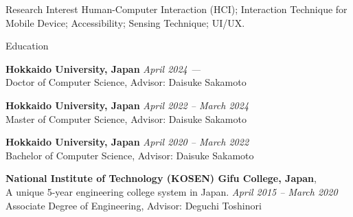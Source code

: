 \documentclass[
	11pt, %
]{resume} %
\begin{document}
\begin{rSection}{Research Interest}
Human-Computer Interaction (HCI); Interaction Technique for Mobile Device; Accessibility; Sensing Technique; UI/UX.
\end{rSection}

\begin{rSection}{Education}
	
	\textbf{Hokkaido University, Japan} \hfill \textit{April 2024 ---} \\ 
	Doctor of Computer Science, Advisor: Daisuke Sakamoto 
    
    \textbf{Hokkaido University, Japan} \hfill \textit{April 2022 -- March 2024} \\ 
	Master of Computer Science, Advisor: Daisuke Sakamoto 

    \textbf{Hokkaido University, Japan} \hfill \textit{April 2020 -- March 2022} \\ 
	Bachelor of Computer Science, Advisor: Daisuke Sakamoto 

    \textbf{National Institute of Technology (KOSEN) Gifu College, Japan}, \\ A unique 5-year engineering college system in Japan. \hfill \textit{April 2015 -- March 2020} \\ 
	Associate Degree of Engineering, Advisor: Deguchi Toshinori
    	
\end{rSection}
\end{document}
